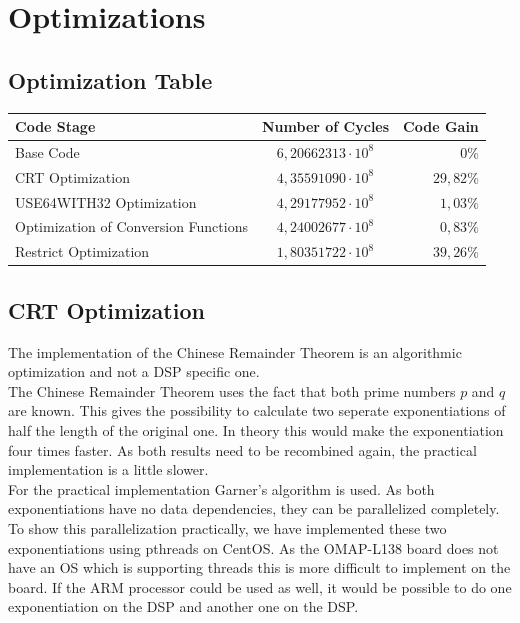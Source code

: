 \documentclass[a4paper]{article}
\begin{document}
\section{Optimizations}

\subsection{Optimization Table}

\begin{center}
    \begin{tabular}{| l | c | r |}
        \hline
        Code Stage & Number of Cycles & Code Gain \\ \hline
        Base Code & $6,20662313 \cdot 10^{8}$ 	& $0\%$ \\
        CRT Optimization & $4,35591090 \cdot 10^{8}$ & $29,82\%$ \\
        USE64WITH32 Optimization 	& $4,29177952 \cdot 10^{8}$ & $1,03\%$ \\
        Optimization of Conversion Functions & $4,24002677 \cdot 10^{8}$ & $0,83\%$ \\
        Restrict Optimization	 & $1,80351722 \cdot 10^{8}$ & $39,26\%$ \\
        \hline
    \end{tabular}
\end{center}

\subsection{CRT Optimization}
The implementation of the Chinese Remainder Theorem is an algorithmic optimization and not a DSP specific one.\\

The Chinese Remainder Theorem uses the fact that both prime numbers $p$ and $q$ are known. This gives the possibility to calculate two seperate exponentiations of half the length of the original one. In theory this would make the exponentiation four times faster. As both results need to be recombined again, the practical implementation is a little slower.\\

For the practical implementation Garner's algorithm is used. As both exponentiations have no data dependencies, they can be parallelized completely. To show this parallelization practically, we have implemented these two exponentiations using pthreads on CentOS. As the OMAP-L138 board does not have an OS which is supporting threads this is more difficult to implement on the board. If the ARM processor could be used as well, it would be possible to do one exponentiation on the DSP and another one on the DSP. \\
\end{document}
